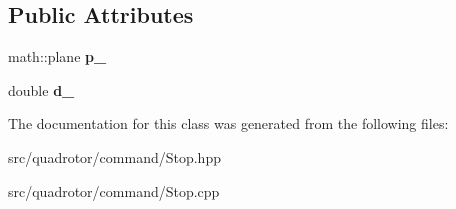 \subsection*{\-Public \-Attributes}
\begin{DoxyCompactItemize}
\item 
\hypertarget{classCommand_1_1Stop_1_1XCross_aa726f4a4450affa991bbdc6650876666}{math\-::plane {\bfseries p\-\_\-}}\label{classCommand_1_1Stop_1_1XCross_aa726f4a4450affa991bbdc6650876666}

\item 
\hypertarget{classCommand_1_1Stop_1_1XCross_a42e2e27b8d4401a205c2267a34765e89}{double {\bfseries d\-\_\-}}\label{classCommand_1_1Stop_1_1XCross_a42e2e27b8d4401a205c2267a34765e89}

\end{DoxyCompactItemize}


\-The documentation for this class was generated from the following files\-:\begin{DoxyCompactItemize}
\item 
src/quadrotor/command/\-Stop.\-hpp\item 
src/quadrotor/command/\-Stop.\-cpp\end{DoxyCompactItemize}
